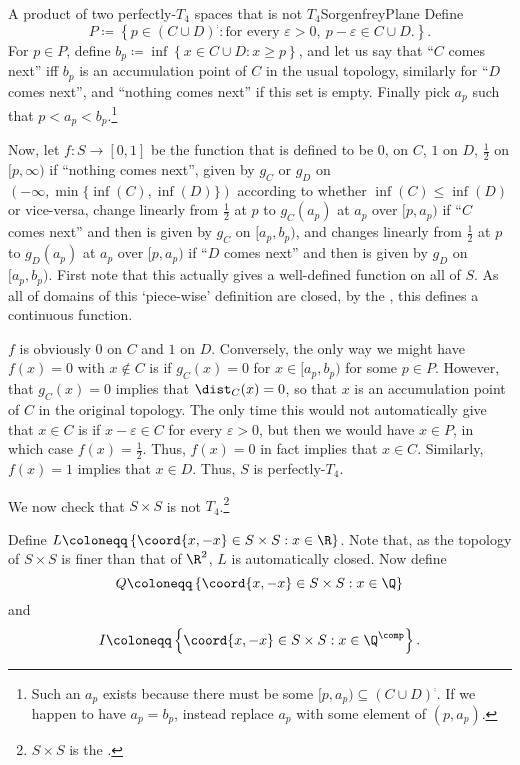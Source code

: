 \begin{exm}{A product of two perfectly-$T_4$ spaces that is not $T_4$}{SorgenfreyPlane}
Define
\begin{equation*}
P\coloneqq \left\{ p\in (C\cup D)^{\comp}:\text{for every }\varepsilon >0,\ p-\varepsilon \in C\cup D\text{.}\right\} .
\end{equation*}
For $p\in P$, define $b_p\coloneqq \inf \left\{ x\in C\cup D:x\geq p\right\}$, and let us say that ``$C$ comes next'' iff $b_p$ is an accumulation point of $C$ in the usual topology, similarly for ``$D$ comes next'', and ``nothing comes next'' if this set is empty.  Finally pick $a_p$ such that $p<a_p<b_p$.\footnote{Such an $a_p$ exists because there must be some $[p,a_p)\subseteq (C\cup D)^{\comp}$.  If we happen to have $a_p=b_p$, instead replace $a_p$ with some element of $(p,a_p)$.}

Now, let $f\colon S\rightarrow [0,1]$ be the function that is defined to be $0$, on $C$, $1$ on $D$, $\tfrac{1}{2}$ on $[p,\infty )$ if ``nothing comes next'', given by $g_C$ or $g_D$ on $(-\infty ,\min \{ \inf (C),\inf (D)\} )$ according to whether $\inf (C)\leq \inf (D)$ or vice-versa, change linearly from $\frac{1}{2}$ at $p$ to $g_C(a_p)$ at $a_p$ over $[p,a_p)$ if ``$C$ comes next'' and then is given by $g_C$ on $[a_p,b_p)$, and changes linearly from $\frac{1}{2}$ at $p$ to $g_D(a_p)$ at $a_p$ over $[p,a_p)$ if ``$D$ comes next'' and then is given by $g_D$ on $[a_p,b_p)$.  First note that this actually gives a well-defined function on all of $S$.  As all of domains of this `piece-wise' definition are closed, by the , this defines a continuous function.

$f$ is obviously $0$ on $C$ and $1$ on $D$.  Conversely, the only way we might have $f(x)=0$ with $x\notin C$ is if $g_C(x)=0$ for $x\in [a_p,b_p)$ for some $p\in P$.  However, that $g_C(x)=0$ implies that $\dist _C(x)=0$, so that $x$ is an accumulation point of $C$ in the original topology.  The only time this would not automatically give that $x\in C$ is if $x-\varepsilon \in C$ for every $\varepsilon >0$, but then we would have $x\in P$, in which case $f(x)=\frac{1}{2}$.  Thus, $f(x)=0$ in fact implies that $x\in C$.  Similarly, $f(x)=1$ implies that $x\in D$.  Thus, $S$ is perfectly-$T_4$.

We now check that $S\times S$ is not $T_4$.\footnote{$S\times S$ is the .}

Define $L\coloneqq \left\{ \coord{x,-x}\in S\times S:x\in \R \right\}$.  Note that, as the topology of $S\times S$ is finer than that of $\R ^2$, $L$ is automatically closed.  Now define
\begin{equation}
Q\coloneqq \left\{ \coord{x,-x}\in S\times S:x\in \Q \right\}
\end{equation}
and
\begin{equation}
I\coloneqq \left\{ \coord{x,-x}\in S\times S:x\in \Q ^{\comp}\right\} .
\end{equation}


\end{exm}
